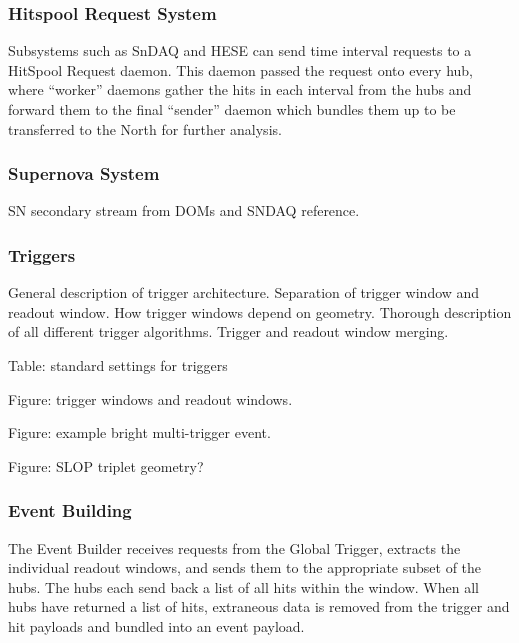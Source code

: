 \subsubsection{Hitspool Request System}

Subsystems such as SnDAQ and HESE can send time interval requests to a HitSpool
Request daemon. This daemon passed the request onto every hub,
where ``worker'' daemons gather the hits in each interval from the hubs
and forward them to the
final ``sender'' daemon which bundles them up to be transferred to the
North
for further analysis.

\subsubsection{Supernova System}

SN secondary stream from DOMs and SNDAQ reference.

\subsubsection{\label{sect:online:trigger}Triggers}

General description of trigger architecture.  Separation of trigger window
and readout window.  How trigger windows depend on geometry.  Thorough
description of all different trigger algorithms. Trigger and readout window
merging.


Table: standard settings for triggers

Figure: trigger windows and readout windows.

Figure: example bright multi-trigger event.

Figure: SLOP triplet geometry?

\subsubsection{\label{sect:online:evbuilder}Event Building}

The Event Builder receives requests from the Global Trigger, extracts
the individual readout windows, and sends them to the appropriate subset of the
hubs.  The hubs each send back a list of all hits within the window.  When all
hubs have returned a list of hits, extraneous data is removed from the trigger
and hit payloads and bundled into an event payload.

